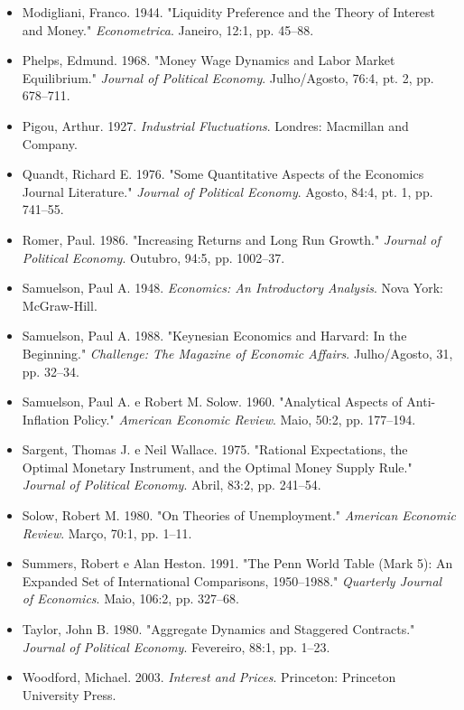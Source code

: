 \documentclass[12pt]{article}
\begin{document}
\begin{itemize}
    \item Modigliani, Franco. 1944. "Liquidity Preference and the Theory of Interest and Money." \textit{Econometrica}. Janeiro, 12:1, pp. 45–88.
    \item Phelps, Edmund. 1968. "Money Wage Dynamics and Labor Market Equilibrium." \textit{Journal of Political Economy}. Julho/Agosto, 76:4, pt. 2, pp. 678–711.
    \item Pigou, Arthur. 1927. \textit{Industrial Fluctuations}. Londres: Macmillan and Company.
    \item Quandt, Richard E. 1976. "Some Quantitative Aspects of the Economics Journal Literature." \textit{Journal of Political Economy}. Agosto, 84:4, pt. 1, pp. 741–55.
    \item Romer, Paul. 1986. "Increasing Returns and Long Run Growth." \textit{Journal of Political Economy}. Outubro, 94:5, pp. 1002–37.
    \item Samuelson, Paul A. 1948. \textit{Economics: An Introductory Analysis}. Nova York: McGraw-Hill.
    \item Samuelson, Paul A. 1988. "Keynesian Economics and Harvard: In the Beginning." \textit{Challenge: The Magazine of Economic Affairs}. Julho/Agosto, 31, pp. 32–34.
    \item Samuelson, Paul A. e Robert M. Solow. 1960. "Analytical Aspects of Anti-Inflation Policy." \textit{American Economic Review}. Maio, 50:2, pp. 177–194.
    \item Sargent, Thomas J. e Neil Wallace. 1975. "Rational Expectations, the Optimal Monetary Instrument, and the Optimal Money Supply Rule." \textit{Journal of Political Economy}. Abril, 83:2, pp. 241–54.
    \item Solow, Robert M. 1980. "On Theories of Unemployment." \textit{American Economic Review}. Março, 70:1, pp. 1–11.
    \item Summers, Robert e Alan Heston. 1991. "The Penn World Table (Mark 5): An Expanded Set of International Comparisons, 1950–1988." \textit{Quarterly Journal of Economics}. Maio, 106:2, pp. 327–68.
    \item Taylor, John B. 1980. "Aggregate Dynamics and Staggered Contracts." \textit{Journal of Political Economy}. Fevereiro, 88:1, pp. 1–23.
    \item Woodford, Michael. 2003. \textit{Interest and Prices}. Princeton: Princeton University Press.
\end{itemize}
\end{document}
